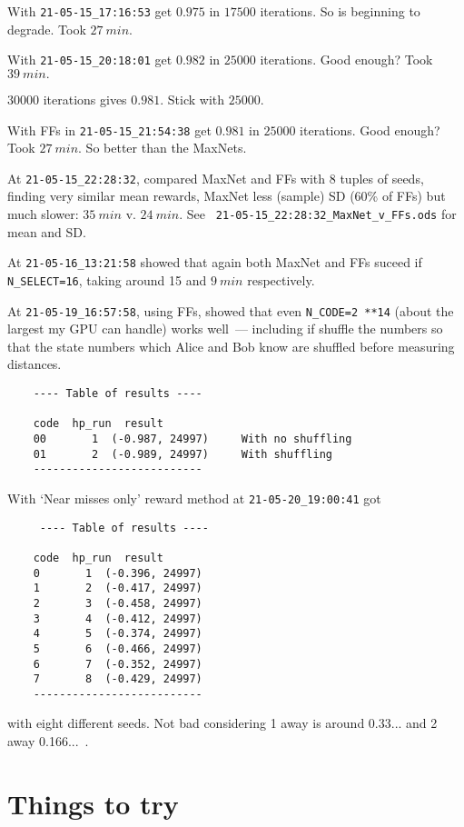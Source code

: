 \documentclass[12pt]{article}
\begin{document}
With \verb|21-05-15_17:16:53| get $0.975$ in $\num{17500}$ iterations.  So is beginning to degrade.  Took $\SI{27}{min}.$

With \verb|21-05-15_20:18:01| get $0.982$ in $\num{25000}$ iterations.  Good enough? Took $\SI{39}{min}.$

$\num{30000}$ iterations gives $0.981.$ Stick with $\num{25000}.$

With FFs in \verb|21-05-15_21:54:38| get $0.981$ in $\num{25000}$ iterations.  Good enough? Took $\SI{27}{min}.$  So better than the MaxNets.

At \verb|21-05-15_22:28:32|, compared MaxNet and FFs with 8 tuples of seeds, finding very similar mean rewards, MaxNet less (sample) SD (60\% of FFs) but much slower: $\SI{35}{min}$ v.  $\SI{24}{min}.$  See \verb| 21-05-15_22:28:32_MaxNet_v_FFs.ods| for mean and SD.

At \verb|21-05-16_13:21:58| showed that again both MaxNet and FFs suceed if \verb|N_SELECT=16|, taking around 15 and $\SI{9}{min}$ respectively.

At \verb|21-05-19_16:57:58|, using FFs, showed that even \verb|N_CODE=2 **14| (about the largest my GPU can handle) works well~--- including if shuffle the numbers so that the state numbers which Alice and Bob know are shuffled before measuring distances.

\begin{lstlisting}
	---- Table of results ----
	
	code  hp_run  result
	00       1  (-0.987, 24997)		With no shuffling
	01       2  (-0.989, 24997)		With shuffling
	--------------------------
\end{lstlisting}

With `Near misses only' reward method at \verb|21-05-20_19:00:41| got
\begin{lstlisting}
	 ---- Table of results ----
	
	code  hp_run  result
	0       1  (-0.396, 24997)
	1       2  (-0.417, 24997)
	2       3  (-0.458, 24997)
	3       4  (-0.412, 24997)
	4       5  (-0.374, 24997)
	5       6  (-0.466, 24997)
	6       7  (-0.352, 24997)
	7       8  (-0.429, 24997)
	--------------------------
\end{lstlisting}
with eight different seeds.  Not bad considering 1 away is around 0.33... and 2 away 0.166...\ .
\section{Things to try}
\end{document}
